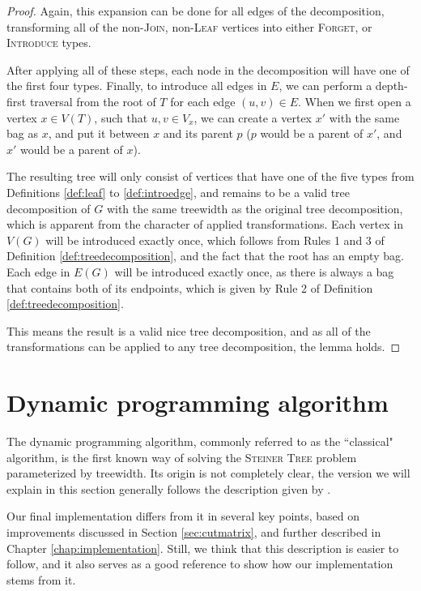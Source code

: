 \documentclass[thesis=M,english,hidelinks]{FITthesis}[2012/10/20]
\theoremstyle{definition}
\begin{document}
\begin{proof}
    Again, this expansion can be done for all edges of the decomposition, transforming all of the non-\textsc{Join},
    non-\textsc{Leaf} vertices into either \textsc{Forget}, or \textsc{Introduce} types.

    After applying all of these steps, each node in the decomposition will have one of the first four types. Finally, to
    introduce all edges in $E$, we can perform a depth-first traversal from the root of $T$ for each edge $(u, v) \in
    E$. When we first open a vertex $x \in V(T)$, such that $u, v \in V_x$, we can create a vertex $x'$ with the same
    bag as $x$, and put it between $x$ and its parent $p$ ($p$ would be a parent of $x'$, and $x'$ would be a parent of
    $x$).

    The resulting tree will only consist of vertices that have one of the five types from Definitions \ref{def:leaf} to
    \ref{def:introedge}, and remains to be a valid tree decomposition of $G$ with the same treewidth as the original
    tree decomposition, which is apparent from the character of applied transformations. Each vertex in $V(G)$ will be
    introduced exactly once, which follows from Rules 1 and 3 of Definition \ref{def:treedecomposition}, and the fact
    that the root has an empty bag. Each edge in $E(G)$ will be introduced exactly once, as there is always a bag that
    contains both of its endpoints, which is given by Rule 2 of Definition \ref{def:treedecomposition}.

    This means the result is a valid nice tree decomposition, and as all of the transformations can be applied to any
    tree decomposition, the lemma holds.
\end{proof}

\section{Dynamic programming algorithm}
\label{sec:twdp}

The dynamic programming algorithm, commonly referred to as the ``classical" algorithm, is the first known way of solving
the \textsc{Steiner Tree} problem parameterized by treewidth. Its origin is not completely clear, the version we
will explain in this section generally follows the description given by \cite[p. 172--176]{Cygan2015}.

Our final implementation differs from it in several key points, based on improvements discussed in Section
\ref{sec:cutmatrix}, and further described in Chapter \ref{chap:implementation}. Still, we think that this description
is easier to follow, and it also serves as a good reference to show how our implementation stems from it.
\end{document}
